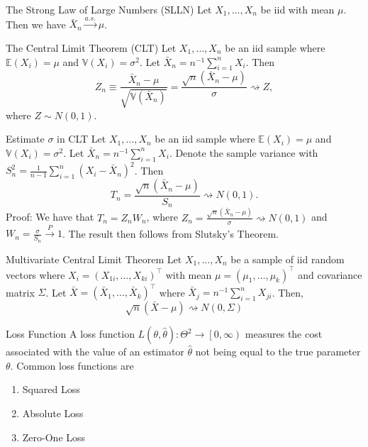 \documentclass[avery5371,grid]{flashcards}
\begin{document}
\begin{flashcard}[Theorem]{The Strong Law of Large Numbers (SLLN) }
Let $X_1,\ldots, X_n$ be iid with mean $\mu$. Then we have $\bar X_n \overset{a.s.} \longrightarrow \mu$. 
\end{flashcard}

\begin{flashcard}[Theorem]{The Central Limit Theorem (CLT)}
Let $X_1, \ldots, X_n$ be an iid sample where $\mathbb E (X_i) = \mu$ and $\mathbb V (X_i) = \sigma^2$. Let $\bar X_n = n^{-1} \sum_{i=1}^n X_i$. Then 
\[
Z_n \equiv \frac{\bar X_n - \mu}{\sqrt{\mathbb V\left(\bar X_n \right)}} = \frac{\sqrt{n}\left(\bar X_n -\mu \right)}{\sigma} \rightsquigarrow Z, 
\]
where $Z \sim N(0,1)$.
\end{flashcard}

\begin{flashcard}[Theorem]{Estimate $\sigma$ in CLT}
Let $X_1, \ldots, X_n$ be an iid sample where $\mathbb E (X_i) = \mu$ and $\mathbb V (X_i) = \sigma^2$. Let $\bar X_n = n^{-1} \sum_{i=1}^n X_i$. Denote the sample variance with
$S_n^2 = \frac{1}{n-1} \sum_{i=1}^n \left( X_i - \bar X_n \right)^2$. Then 
\[
T_n = \frac{\sqrt{n}\left(\bar X_n -\mu \right)}{S_n} \rightsquigarrow N(0,1).
\]
Proof:  We have that $T_n = Z_nW_n$, where $Z_n = \frac{\sqrt{n}\left(\bar X_n -\mu \right)}{\sigma} \rightsquigarrow N(0,1)$ and $W_n = \frac{\sigma}{S_n} \overset{P} \to 1$. The result
then follows from Slutsky's Theorem.
\end{flashcard}

\begin{flashcard}[Theorem]{Multivariate Central Limit Theorem}
Let $X_1,\ldots,X_n$ be a sample of iid random vectors where $X_i = \left( X_{1i} , \ldots, X_{ki} \right)^\intercal$ with mean $\mu = \left( \mu_1, \ldots, \mu_k \right)^\intercal$ 
and covariance matrix $\Sigma$. Let $\bar X = \left( \bar X_1 , \ldots, \bar X_k \right)^\intercal$ where $\bar X_j = n^{-1} \sum_{i=1}^n X_{ji}$. Then,
\[
\sqrt{n} \left(\bar X - \mu \right) \rightsquigarrow N(0,\Sigma)
\]
\end{flashcard}

\begin{flashcard}[Definition]{Loss Function}
A loss function $L\left(\theta, \hat \theta \right) : \Theta^2 \to \left[0,\infty\right)$ measures the cost associated with the value of an 
estimator $\hat \theta$ not being equal to the true parameter $\theta$. Common loss functions are 
\begin{enumerate}
 \item Squared Loss
 \item Absolute Loss
 \item Zero-One Loss
\end{enumerate}

\end{flashcard}
\end{document}
